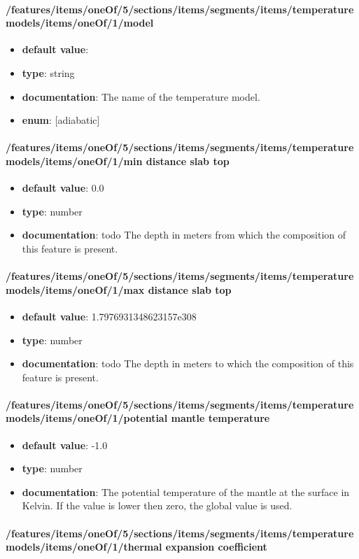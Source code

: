\paragraph{/features/items/oneOf/5/sections/items/segments/items/temperature models/items/oneOf/1/model}
\begin{itemize}\item {\bf default value}: 
\item {\bf type}: string
\item {\bf documentation}: The name of the temperature model.
\item {\bf enum}: [adiabatic]\end{itemize}\paragraph{/features/items/oneOf/5/sections/items/segments/items/temperature models/items/oneOf/1/min distance slab top}
\begin{itemize}\item {\bf default value}: 0.0
\item {\bf type}: number
\item {\bf documentation}: todo The depth in meters from which the composition of this feature is present.
\end{itemize}\paragraph{/features/items/oneOf/5/sections/items/segments/items/temperature models/items/oneOf/1/max distance slab top}
\begin{itemize}\item {\bf default value}: 1.7976931348623157e308
\item {\bf type}: number
\item {\bf documentation}: todo The depth in meters to which the composition of this feature is present.
\end{itemize}\paragraph{/features/items/oneOf/5/sections/items/segments/items/temperature models/items/oneOf/1/potential mantle temperature}
\begin{itemize}\item {\bf default value}: -1.0
\item {\bf type}: number
\item {\bf documentation}: The potential temperature of the mantle at the surface in Kelvin. If the value is lower then zero, the global value is used.
\end{itemize}\paragraph{/features/items/oneOf/5/sections/items/segments/items/temperature models/items/oneOf/1/thermal expansion coefficient}
